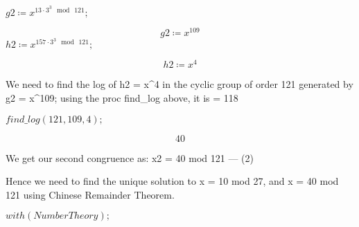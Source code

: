\documentclass[11pt,a4paper,fleqn]{article}
\begin{document}
\begin{enumerate}[1.]
\begin{flushleft}
\begin{enumerate}
\begin{mdframed}
\begin{Maple Normal}
					\end{Maple Normal}
					\mapleinput
					{$ \displaystyle \mathit{g2} \coloneqq x^{13\cdot 3^{3}\mod \,121}; $}

					\begin{dmath}\label{(6)}
						\mathit{g2} \coloneqq x^{109}
					\end{dmath}
					\mapleinput
					{$ \displaystyle \mathit{h2} \coloneqq x^{157\cdot 3^{3}\mod \,121}; $}

					\begin{dmath}\label{(7)}
						\mathit{h2} \coloneqq x^{4}
					\end{dmath}
					\begin{Maple Normal}
						We need to find the log of h2 = x^4 in the cyclic group of order 121 generated by g2 = x^109; using the proc find\_log above, it is = 118
					\end{Maple Normal}
					\mapleinput
					{$ \displaystyle \textit{find\_log} (121,109,4); $}

					\begin{dmath}\label{(8)}
						40
					\end{dmath}
					\begin{Maple Normal}
						We get our second congruence as: x2 = 40 mod 121 --- (2)
					\end{Maple Normal}
					\begin{Maple Normal}

					\end{Maple Normal}
					\begin{Maple Normal}
						Hence  we need to find the unique solution to x = 10 mod 27, and x = 40 mod 121 using Chinese Remainder Theorem.
					\end{Maple Normal}
					\begin{Maple Normal}

					\end{Maple Normal}
					\mapleinput
					{$ \displaystyle \mathit{with} (\mathit{NumberTheory}); $}


\end{mdframed}
\end{enumerate}
\end{flushleft}
\end{enumerate}
\end{document}
